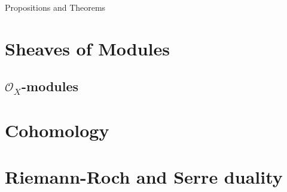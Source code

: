\documentclass[a4paper, 12pt]{article}
\newcommand{\oxmods}{$\mathcal{O}_X$-modules}
\begin{document}
	
	
	\setcounter{section}{4}
	
	{\LARGE Propositions and Theorems}
	
	
	\section{Sheaves of Modules}
	
	\subsection{\oxmods}
	
	\section{Cohomology}
	
	\section{Riemann-Roch and Serre duality}
	
	
	
	
	
	
	
\end{document}
